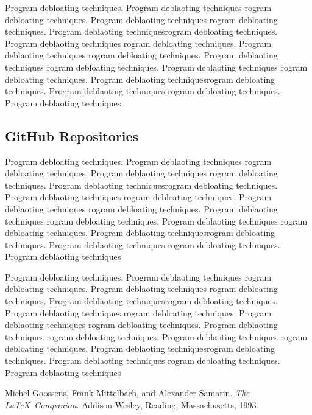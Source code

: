 \documentclass{relatorio}
\begin{document}
Program debloating techniques. Program deblaoting techniques rogram debloating techniques. Program deblaoting techniques
rogram debloating techniques. Program deblaoting techniquesrogram debloating techniques. Program deblaoting techniques
rogram debloating techniques. Program deblaoting techniques rogram debloating techniques. Program deblaoting techniques
rogram debloating techniques. Program deblaoting techniques 
rogram debloating techniques. Program deblaoting techniquesrogram debloating techniques. Program deblaoting techniques
rogram debloating techniques. Program deblaoting techniques

\subsection{GitHub Repositories}%
\label{Tools}

Program debloating techniques. Program deblaoting techniques rogram debloating techniques. Program deblaoting techniques
rogram debloating techniques. Program deblaoting techniquesrogram debloating techniques. Program deblaoting techniques
rogram debloating techniques. Program deblaoting techniques rogram debloating techniques. Program deblaoting techniques
rogram debloating techniques. Program deblaoting techniques 
rogram debloating techniques. Program deblaoting techniquesrogram debloating techniques. Program deblaoting techniques
rogram debloating techniques. Program deblaoting techniques

Program debloating techniques. Program deblaoting techniques rogram debloating techniques. Program deblaoting techniques
rogram debloating techniques. Program deblaoting techniquesrogram debloating techniques. Program deblaoting techniques
rogram debloating techniques. Program deblaoting techniques rogram debloating techniques. Program deblaoting techniques
rogram debloating techniques. Program deblaoting techniques 
rogram debloating techniques. Program deblaoting techniquesrogram debloating techniques. Program deblaoting techniques
rogram debloating techniques. Program deblaoting techniques

\nocite{*}
\begin{thebibliography}{9}
	Michel Goossens, Frank Mittelbach, and Alexander Samarin. 
	\textit{The \LaTeX\ Companion}. 
	Addison-Wesley, Reading, Massachusetts, 1993.
	
\end{thebibliography}
\end{document}
